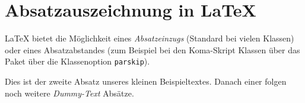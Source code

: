 \documentclass[a4paper, parskip=half]{scrartcl}
\begin{document}
%
\section*{Absatzauszeichnung in \LaTeX}
%
\LaTeX{} bietet die Möglichkeit eines \emph{Absatzeinzugs} (Standard bei vielen Klassen) oder eines Absatzabstandes (zum Beispiel bei den Koma-Skript Klassen über das Paket über die Klassenoption \texttt{parskip}).

Dies ist der zweite Absatz unseres kleinen Beispieltextes. Danach einer folgen noch weitere \emph{Dummy-Text} Absätze.

\blindtext

\blindtext

\blindtext
\end{document}
